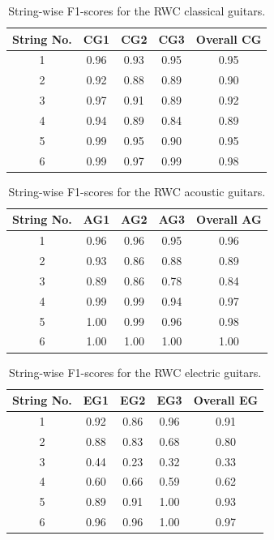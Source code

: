 \documentclass[12pt]{cmuthesis}
\begin{document}
\begin{table}[!htbp]
\begin{center}
\begin{tabular}{||c|c|c|c|c||}
\hline
String No. & CG1 & CG2 & CG3 & Overall CG \\
\hline
1 & 0.96 & 0.93 & 0.95 & 0.95 \\
\hline
2 & 0.92 & 0.88 & 0.89 & 0.90 \\
\hline
3 & 0.97 & 0.91 & 0.89 & 0.92 \\
\hline
4 & 0.94 & 0.89 & 0.84 & 0.89 \\
\hline
5 & 0.99 & 0.95 & 0.90 & 0.95 \\
\hline
6 & 0.99 & 0.97 & 0.99 & 0.98\\ 
\hline
\hline
\end{tabular}
\caption{String-wise F1-scores for the RWC classical guitars.} 
\label{tab:cg-str-f}
\end{center}
\end{table}

\begin{table}[!htbp]
\begin{center}
\begin{tabular}{||c||c|c|c|c||}
\hline
String No. & AG1 & AG2 & AG3 & Overall AG \\
\hline
1 &  0.96 & 0.96 & 0.95 & 0.96 \\
\hline
2 & 0.93 & 0.86 & 0.88 & 0.89 \\
\hline
3 & 0.89 & 0.86 & 0.78 & 0.84\\
\hline
4 & 0.99 & 0.99 & 0.94 & 0.97 \\
\hline
5 & 1.00 & 0.99 & 0.96 & 0.98 \\
\hline
6 & 1.00 & 1.00 & 1.00 & 1.00 \\ 
\hline
\hline
\end{tabular}
\caption{String-wise F1-scores for the RWC acoustic guitars.} 
\label{tab:ag-str-f}
\end{center}
\end{table}

\begin{table}[!htbp]
\begin{center}
\begin{tabular}{||c||c|c|c|c||}
\hline
String No. & EG1 & EG2 & EG3 & Overall EG\\
\hline
1 & 0.92 & 0.86 & 0.96 & 0.91 \\
\hline
2 & 0.88 & 0.83 & 0.68 & 0.80\\
\hline
3 & 0.44 & 0.23 & 0.32 & 0.33 \\
\hline
4 & 0.60 & 0.66 & 0.59 & 0.62 \\
\hline
5 & 0.89 & 0.91 & 1.00 & 0.93 \\
\hline
6 & 0.96 & 0.96 & 1.00 & 0.97 \\ 
\hline
\hline
\end{tabular}
\caption{String-wise F1-scores for the RWC electric guitars.} 
\label{tab:eg-str-f}
\end{center}
\end{table}
\end{document}
